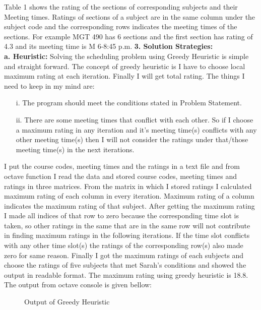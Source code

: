 \documentclass[paper=letter, fontsize=11pt]{scrartcl} %
\begin{document}
Table 1 shows the rating of the sections of corresponding subjects and their Meeting times. Ratings of sections of a subject are in the same column under the subject code and the corresponding rows indicates the meeting times of the sections. For example MGT 490 has 6 sections and the first section has rating of 4.3 and its meeting time is M 6-8:45 p.m.
\newline
\newline
\Large \textbf{3. Solution Strategies:}\\
\newline
 \normalsize \textbf{a. Heuristic:}
Solving the scheduling problem using Greedy Heuristic is simple and straight forward. The concept of greedy heuristic is I have to choose local maximum rating at each iteration. Finally I will get total rating. The things I need to keep in my mind are:  
\begin{enumerate}[align=left,style=nextline,leftmargin=1.5cm,labelsep=\parindent,font=\normalfont]
\item[i.] The program should meet the conditions stated in Problem Statement.
\item[ii.] There are some meeting times that conflict with each other. So if I choose a maximum rating in any iteration and it's meeting time(s) conflicts with any other meeting time(s) then I will not consider the ratings under that/those meeting time(s) in the next iterations.
\end{enumerate}  

I put the course codes, meeting times and the ratings in a text file and from octave function I read the data and stored course codes, meeting times and ratings in three matrices. From the matrix in which I stored ratings I calculated maximum rating of each column in every iteration. Maximum rating of a column indicates the maximum rating of that subject. After getting the maximum rating I made all indices of that row to zero because the corresponding time slot is taken, so other ratings in the same that are in the same row will not contribute in finding maximum ratings in the following iterations. If the time slot conflicts with any other time slot(s) the ratings of the corresponding row(s) also made zero for same reason. Finally I got the maximum ratings of each subjects and choose the ratings of five subjects that met Sarah's conditions and showed the output in readable format. The maximum rating using greedy heuristic is 18.8.
The output from octave console is given bellow:

\begin{figure}[H]
  
  \centering
    
    \caption{Output of Greedy Heuristic}
\end{figure}
\end{document}
